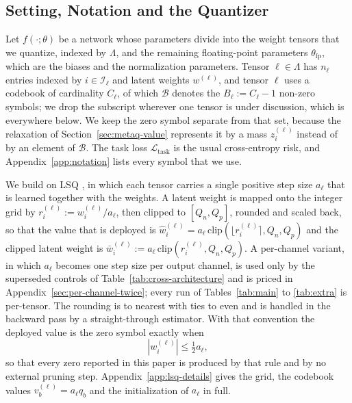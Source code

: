 \documentclass{article}
\begin{document}
\subsection{Setting, Notation and the Quantizer}
\label{sec:setting}
\label{sec:lsq}

Let $f(\cdot;\theta)$ be a network whose parameters divide into the weight
tensors that we quantize, indexed by $\Lambda$, and the remaining
floating-point parameters $\theta_{\mathrm{fp}}$, which are the biases and the
normalization parameters. Tensor $\ell\in\Lambda$ has $n_\ell$ entries indexed by
$i\in\mathcal I_\ell$ and latent weights $w^{(\ell)}$, and tensor $\ell$ uses a codebook of cardinality
$C_\ell$, of which $\mathcal B$ denotes the $B_\ell:=C_\ell-1$ non-zero symbols;
we drop the subscript wherever one tensor is under discussion, which is everywhere
below.
We keep the zero symbol separate from that set, because the relaxation of
Section~\ref{sec:metaq-value} represents it by a mass $z_i^{(\ell)}$ instead of by
an element of $\mathcal B$. The task loss $\mathcal L_{\mathrm{task}}$ is the
usual cross-entropy risk, and Appendix~\ref{app:notation} lists every symbol that
we use.

We build on LSQ \citep{esser2020lsq}, in which each tensor carries a single
positive step size $a_\ell$ that is learned together with the weights. A latent
weight is mapped onto the integer grid by $r_i^{(\ell)}:=w_i^{(\ell)}/a_\ell$,
then clipped to $[Q_n,Q_p]$, rounded and scaled back, so that the value that is
deployed is
$\widehat w_i^{(\ell)}=a_\ell\,\mathrm{clip}(\lfloor r_i^{(\ell)}\rceil,Q_n,Q_p)$
and the clipped latent weight is
$\bar w_i^{(\ell)}:=a_\ell\,\mathrm{clip}(r_i^{(\ell)},Q_n,Q_p)$. A per-channel
variant, in which $a_\ell$ becomes one step size per output channel, is used only
by the superseded controls of Table~\ref{tab:cross-architecture} and is priced in
Appendix~\ref{sec:per-channel-twice}; every run of Tables~\ref{tab:main} to
\ref{tab:extra} is per-tensor. The
rounding is to nearest with ties to even and is handled in the backward pass by a
straight-through estimator. With that convention the deployed value is the zero
symbol exactly when
\begin{equation}
  \left|w_i^{(\ell)}\right|\leq\tfrac{1}{2}a_\ell,
  \label{eq:lsq-zero-symbol}
\end{equation}
so that every zero reported in this paper is produced by that rule and by no
external pruning step. Appendix~\ref{app:lsq-details} gives the grid, the codebook
values $v_b^{(\ell)}=a_\ell q_b$ and the initialization of $a_\ell$ in full.
\end{document}

